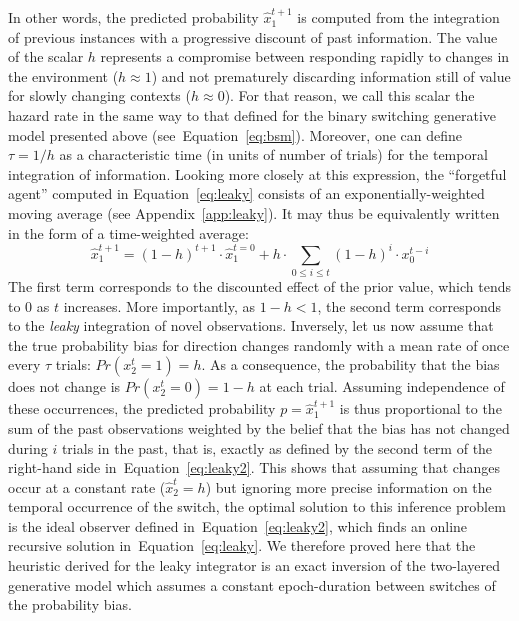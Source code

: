 \documentclass[10pt,letterpaper]{article}
\newcommand{\eql}[1]{\begin{equation}#1\end{equation}}
\newcommand{\seeEq}[1]{Equation~\ref{eq:#1}}
\newcommand{\seeApp}[1]{Appendix~\ref{app:#1}}
\begin{document}
In other words, the predicted probability $\hat{x}_1^{t+1}$ is computed
from the integration of previous instances
with a progressive discount of past information.
The value of the scalar $h$ represents
a compromise between responding rapidly
to changes in the environment ($h \approx 1$) and
not prematurely discarding information still of value
for slowly changing contexts  ($h \approx 0$).
For that reason, we call this scalar the hazard rate
in the same way to that defined for the binary switching generative model presented above (see~\seeEq{bsm}).
Moreover, one can define $\tau = 1 / h$ as
a characteristic time (in units of number of trials)
for the temporal integration of information.
Looking more closely at this expression,
the ``forgetful agent'' computed in \seeEq{leaky}
consists of an exponentially-weighted moving average (see \seeApp{leaky}).
It may thus be equivalently written in the form of a time-weighted average:
\eql{
\hat{x}_1^{t+1} = (1-h)^{t+1} \cdot \hat{x}_1^{t=0} + h \cdot \sum_{0\leq i \leq t} (1 - h)^{i} \cdot x_0^{t-i}
\label{eq:leaky2}}
The first term corresponds to the discounted effect of the prior value,
which tends to $0$ as $t$ increases.
More importantly, as $1-h < 1$, the second term corresponds to the \emph{leaky} integration of novel observations.
Inversely, let us now assume that
the true probability bias for direction changes randomly with a mean rate of once
every $\tau$ trials: $Pr(x_2^t=1)=h$.
As a consequence, the probability that the bias does not change is $Pr(x_2^t=0)=1-h$ at each trial.
Assuming independence of these occurrences, the predicted probability $p=\hat{x}_1^{t+1}$ is thus proportional to the sum
of the past observations weighted by the belief that the bias has not changed during $i$ trials in the past, that is, exactly as defined by the second term of the right-hand side in~\seeEq{leaky2}.
This shows that assuming that changes occur at a constant rate ($\hat{x}_2^t=h$)
but ignoring more precise information on the temporal occurrence of the switch,
the optimal solution to this inference problem is the
ideal observer defined in~\seeEq{leaky2},
which finds an online recursive solution in~\seeEq{leaky}.
We therefore proved here that the heuristic derived for the leaky integrator
is an exact inversion of the two-layered generative model
which assumes a constant epoch-duration between switches of the probability bias.
\end{document}
